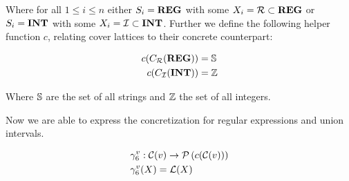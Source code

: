 Where for all $1 \leq i \leq n$ either $S_i = \mathbf{REG}$ with some $X_i = \mathcal{R} \subset \mathbf{REG}$ or $S_i = \mathbf{INT}$ with some $X_i = \mathcal{I} \subset \mathbf{INT}$.
Further we define the following helper function $c$, relating cover lattices to their concrete counterpart:


\begin{align}
    c(C_{\mathcal{R}}(\mathbf{REG})) &= \mathbb{S} \\
    c(C_{\mathcal{I}}(\mathbf{INT})) &= \mathbb{Z}
\end{align}


Where $\mathbb{S}$ are the set of all strings and $\mathbb{Z}$ the set of all integers.

Now we are able to express the concretization for regular expressions and union intervals.

\begin{align}
    &\gamma^v_6 : \mathcal{C}(v) \rightarrow \mathcal{P}\left(c(\mathcal{C}(v))\right) \\
    &\gamma^v_6(X) = \mathcal{L}(X)
\end{align}

%



